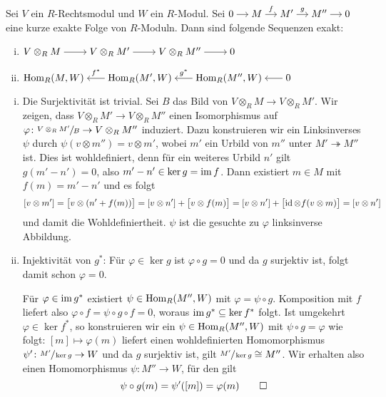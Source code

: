 \begin{lemma}[{name=[{Exaktheit vom Tensorieren und Hom}]},label=lem:exakt_tens_hom]
	Sei $V$ ein $R$-Rechtsmodul und $W$ ein $R$-Modul.
	Sei $\begin{tikzcd}[cramped,sep=small]
		0 \rar& M \rar["f"] &M' \rar["g"] & M'' \rar & 0
	\end{tikzcd}$ 
	eine kurze exakte Folge von $R$-Moduln.
	Dann sind folgende Sequenzen exakt:
	\begin{enumerate}[(i),itemsep=0pt]
		\item \( \begin{tikzcd}[cramped,sep=2.3em]
					V \otimes_R M \rar & V \otimes_R M' \rar & V \otimes_R M'' \rar & 0
				\end{tikzcd} \)
		\item $\begin{tikzcd}[cramped,sep=1.8em]
			\Hom_R(M,W)  & \Hom_R(M',W) \lar["f^*"'] & \Hom_R(M'',W) \lar["g^*"'] & 0 \lar
		\end{tikzcd}$
	\end{enumerate}
\end{lemma}
\begin{beweis}
	\leavevmode
	\begin{enumerate}[(i)]
		\item Die Surjektivität ist trivial.
		Sei $B$ das Bild von $V \otimes_R M \to V \otimes_R M'$.
		Wir zeigen, dass $V \otimes_R M' \to V \otimes_R M''$ einen Isomorphismus auf $\varphi \colon\sfrac{V \otimes_R M'}{B} \to V \otimes_R M''$ induziert.
		Dazu konstruieren wir ein Linksinverses $\psi$ durch $\psi(v \otimes m'') = v \otimes m'$, wobei $m'$ ein Urbild von $m''$ unter $M' \twoheadrightarrow M''$ ist.
		Dies ist wohldefiniert, denn für ein weiteres Urbild $n'$ gilt $g(m'-n')=0$, also $m'-n' \in \ker g = \im f$.
		Dann existiert $m \in M$ mit $f(m)=m'-n'$ und es folgt
		\[
			[v \otimes m'] = \benbrace[\big]{v \otimes \enbrace*{n' + f(m)}} = \benbrace*{v \otimes n'} + \benbrace[\big]{v \otimes f(m)} = \benbrace*{v \otimes n'} + \benbrace[\big]{\id \otimes f (v \otimes m)} = \benbrace*{v \otimes n'}
		\]
		und damit die Wohldefiniertheit. $\psi$ ist die gesuchte zu $\varphi$ linksinverse Abbildung.
		\item Injektivität von $g^*$: Für $\varphi \in \ker g$ ist $\varphi \circ g =0$ und da $g$ surjektiv ist, folgt damit schon $\varphi=0$.
		
		Für $\varphi \in \im g^*$ existiert $\psi \in \Hom_R(M'',W)$ mit $\varphi= \psi \circ g$. 
		Komposition mit $f$ liefert also $\varphi \circ f = \psi \circ g \circ f =0$, woraus $\im g^* \subseteq \ker f^*$ folgt.
		Ist umgekehrt $\varphi \in \ker f^*$, so konstruieren wir ein $\psi \in  \Hom_R(M'',W)$ mit $\psi \circ g = \varphi$ wie folgt:
		$[m] \mapsto \varphi(m)$ liefert einen wohldefinierten Homomorphismus $\psi' \colon \sfrac{M'}{\ker g} \to W$ und da $g$ surjektiv ist, gilt $\sfrac{M'}{\ker g} \cong  M''$.
		Wir erhalten also einen Homomorphismus $\psi \colon M'' \to W$, für den gilt
		\[
			\psi \circ g(m) = \psi' ([m]) = \varphi(m) \qedhere
		\]
	\end{enumerate}
\end{beweis}

